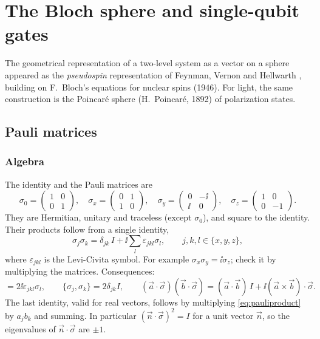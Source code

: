 \chapter{The Bloch sphere and single-qubit gates}\label{ch:bloch}

The geometrical representation of a two-level system as a vector on a sphere appeared as the \emph{pseudospin} representation of
Feynman, Vernon and Hellwarth \cite{FVH1957}, building on F.~Bloch's equations for nuclear spins (1946). For light, the same
construction is the Poincaré sphere (H.~Poincaré, 1892) of polarization states.

\section{Pauli matrices}\label{sec:pauli}
\subsection{Algebra}
The identity and the Pauli matrices are
\begin{equation}
  \sigma_0=\begin{pmatrix}1&0\\0&1\end{pmatrix},\quad
  \sigma_x=\begin{pmatrix}0&1\\1&0\end{pmatrix},\quad
  \sigma_y=\begin{pmatrix}0&-\ii\\ \ii&0\end{pmatrix},\quad
  \sigma_z=\begin{pmatrix}1&0\\0&-1\end{pmatrix}.
\end{equation}
They are Hermitian, unitary and traceless (except $\sigma_0$), and square to the identity. Their products follow from a single identity,
\begin{equation}\label{eq:pauliproduct}
  \sigma_j\sigma_k=\delta_{jk}\,I+\ii\sum_l\varepsilon_{jkl}\sigma_l,\qquad j,k,l\in\{x,y,z\},
\end{equation}
where $\varepsilon_{jkl}$ is the Levi-Civita symbol. For example $\sigma_x\sigma_y=\ii\sigma_z$; check it by multiplying the matrices.
Consequences:
\begin{equation}
  [\sigma_j,\sigma_k]=2\ii\varepsilon_{jkl}\sigma_l,\qquad\{\sigma_j,\sigma_k\}=2\delta_{jk}I,\qquad
  (\vec a\cdot\vec\sigma)(\vec b\cdot\vec\sigma)=(\vec a\cdot\vec b)\,I+\ii(\vec a\times\vec b)\cdot\vec\sigma.
\end{equation}
The last identity, valid for real vectors, follows by multiplying \cref{eq:pauliproduct} by $a_jb_k$ and summing. In particular
$(\vec n\cdot\vec\sigma)^2=I$ for a unit vector $\vec n$, so the eigenvalues of $\vec n\cdot\vec\sigma$ are $\pm1$.

